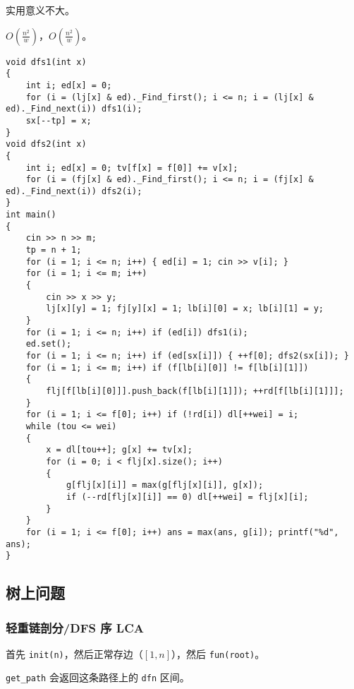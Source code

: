 \documentclass[12pt]{ctexart}
\begin{document}
实用意义不大。

$O(\frac{n^2}w)$，$O(\frac {n^2}w)$。

\begin{lstlisting}
void dfs1(int x)
{
	int i; ed[x] = 0;
	for (i = (lj[x] & ed)._Find_first(); i <= n; i = (lj[x] & ed)._Find_next(i)) dfs1(i);
	sx[--tp] = x;
}
void dfs2(int x)
{
	int i; ed[x] = 0; tv[f[x] = f[0]] += v[x];
	for (i = (fj[x] & ed)._Find_first(); i <= n; i = (fj[x] & ed)._Find_next(i)) dfs2(i);
}
int main()
{
	cin >> n >> m;
	tp = n + 1;
	for (i = 1; i <= n; i++) { ed[i] = 1; cin >> v[i]; }
	for (i = 1; i <= m; i++)
	{
		cin >> x >> y;
		lj[x][y] = 1; fj[y][x] = 1; lb[i][0] = x; lb[i][1] = y;
	}
	for (i = 1; i <= n; i++) if (ed[i]) dfs1(i);
	ed.set();
	for (i = 1; i <= n; i++) if (ed[sx[i]]) { ++f[0]; dfs2(sx[i]); }
	for (i = 1; i <= m; i++) if (f[lb[i][0]] != f[lb[i][1]])
	{
		flj[f[lb[i][0]]].push_back(f[lb[i][1]]); ++rd[f[lb[i][1]]];
	}
	for (i = 1; i <= f[0]; i++) if (!rd[i]) dl[++wei] = i;
	while (tou <= wei)
	{
		x = dl[tou++]; g[x] += tv[x];
		for (i = 0; i < flj[x].size(); i++)
		{
			g[flj[x][i]] = max(g[flj[x][i]], g[x]);
			if (--rd[flj[x][i]] == 0) dl[++wei] = flj[x][i];
		}
	}
	for (i = 1; i <= f[0]; i++) ans = max(ans, g[i]); printf("%d", ans);
}
\end{lstlisting}



\subsection{树上问题}

\subsubsection{轻重链剖分/DFS 序 LCA}

首先 \verb|init(n)|，然后正常存边（$[1,n]$），然后 \verb|fun(root)|。

\verb|get_path| 会返回这条路径上的 \verb|dfn| 区间。
\end{document}
